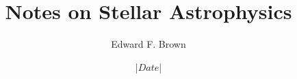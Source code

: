 \documentclass[11pt]{book}
\begin{document}
\title{Notes on Stellar Astrophysics}
\author{ Edward F. Brown}
\date{|$Date$|}
\maketitle
\DeleteShortVerb{\|}
\tableofcontents













\appendix


\end{document}
